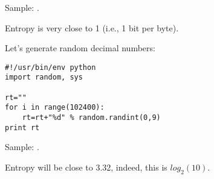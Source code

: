 Sample: .

Entropy is very close to 1 (i.e., 1 bit per byte).

Let's generate random decimal numbers:

\begin{lstlisting}[style=custompy]
#!/usr/bin/env python
import random, sys

rt=""
for i in range(102400):
    rt=rt+"%d" % random.randint(0,9)
print rt
\end{lstlisting}

Sample: .

Entropy will be close to 3.32, indeed, this is $log_2(10)$.

